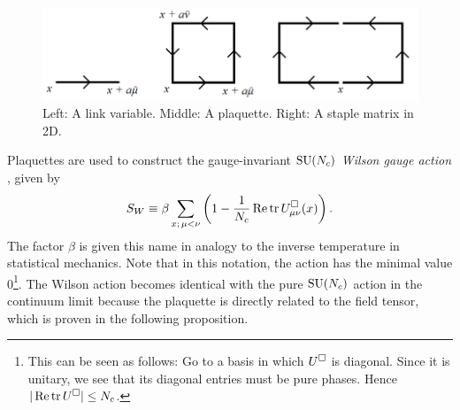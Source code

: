 \begin{figure}[t]
  \centering
  \includegraphics[width=0.9\linewidth]{figs/links.png}
  \caption{Left: A link variable. Middle: A plaquette. 
           Right: A staple matrix in 2D.}
  \label{fig:links}
\end{figure}

Plaquettes are used to construct the gauge-invariant $\operatorname{SU}(N_c)$ {\it Wilson
gauge action} \cite{wilson_confinement_1974}, given by
\begin{equation}\label{eq:wilsonaction}\index{Wilson!gauge action}\index{action!Wilson gauge}
    S_W\equiv\beta\sum\limits_{x;\,\mu<\nu}\left(1
         -\frac{1}{N_c}\Re\tr \plaq_{\mu\nu}(x)\right).
\end{equation}
The factor $\beta$ is given this name in analogy to the inverse temperature 
in statistical mechanics. Note that in this notation, the action has the
minimal value 0\footnote{This can be seen as follows: Go to a basis in which
$U^\square$ is diagonal. Since it is unitary, we see that its diagonal
entries must be pure phases. Hence $|\mathop{\mathrm{Re}}\tr U^\square|\leq N_c$.}. 
The Wilson action becomes identical with the
pure $\operatorname{SU}(N_c)$ action in the continuum limit because the plaquette is
directly related to the field tensor, which is proven in the following
proposition. 
